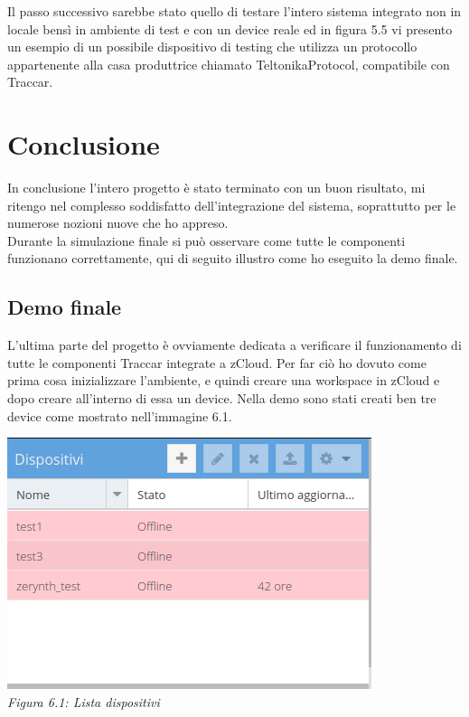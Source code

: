 \documentclass[a4paper,titlepage,12pt]{report}
\begin{document}
{Il passo successivo sarebbe stato quello di testare l'intero sistema integrato non in locale bensì in ambiente di test e con un device reale ed in figura 5.5 vi presento un esempio di un possibile dispositivo di testing che utilizza un protocollo appartenente alla casa produttrice chiamato TeltonikaProtocol, compatibile con Traccar.\\


\chapter{
Conclusione}
In conclusione l'intero progetto è stato terminato con un buon risultato, mi ritengo nel complesso soddisfatto dell'integrazione del sistema, soprattutto per le numerose nozioni nuove che ho appreso.\\
Durante la simulazione finale si può osservare come tutte le componenti funzionano correttamente, qui di seguito illustro come ho eseguito la demo finale.

\section{
Demo finale}
L'ultima parte del progetto è ovviamente dedicata a verificare il funzionamento di tutte le componenti Traccar integrate a zCloud. Per far ciò ho dovuto come prima cosa inizializzare l'ambiente, e quindi creare una workspace in zCloud e dopo creare all'interno di essa un device. Nella demo sono stati creati ben tre device come mostrato nell'immagine 6.1.



\begin{center}
\includegraphics[scale=0.53]{images/dev.png}\\ 
\textit{Figura 6.1: Lista dispositivi}
\end{center}

}
\end{document}
